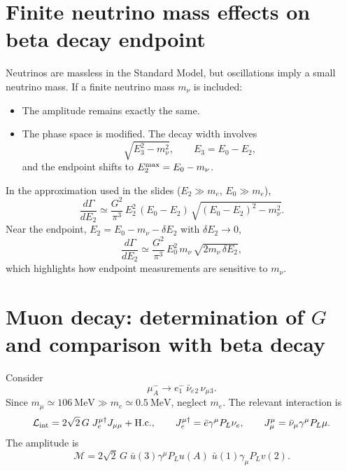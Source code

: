 \section{Finite neutrino mass effects on beta decay endpoint}
Neutrinos are massless in the Standard Model, but oscillations imply a small neutrino mass.
If a finite neutrino mass $m_\nu$ is included:
\begin{itemize}
  \item The amplitude remains exactly the same.
  \item The phase space is modified. The decay width involves
        \begin{equation}
        \sqrt{E_3^2-m_\nu^2},
        \qquad E_3=E_0-E_2,
        \end{equation}
        and the endpoint shifts to $E_2^{\rm max}=E_0-m_\nu$.
\end{itemize}
In the approximation used in the slides ($E_2\gg m_e$, $E_0\gg m_e$),
\begin{equation}
\boxed{
\frac{d\Gamma}{dE_2}
\simeq
\frac{G^2}{\pi^3}\,E_2^2\,(E_0-E_2)\,\sqrt{(E_0-E_2)^2-m_\nu^2}.
}
\end{equation}
Near the endpoint, $E_2=E_0-m_\nu-\delta E_2$ with $\delta E_2\to 0$,
\begin{equation}
\frac{d\Gamma}{dE_2}
\simeq
\frac{G^2}{\pi^3}\,E_0^2\,m_\nu\,\sqrt{2m_\nu\,\delta E_2},
\end{equation}
which highlights how endpoint measurements are sensitive to $m_\nu$.

\section{Muon decay: determination of $G$ and comparison with beta decay}
Consider
\begin{equation}
\mu^-_A \to e^-_1\,\bar\nu_e{}_2\,\nu_\mu{}_3.
\end{equation}
Since $m_\mu\simeq 106~\text{MeV}\gg m_e\simeq 0.5~\text{MeV}$, neglect $m_e$.
The relevant interaction is
\begin{equation}
\mathcal{L}_{\rm int}
=
2\sqrt{2}\,G\;J_e^{\mu\dagger}J_{\mu\mu}+\text{H.c.},
\qquad
J_e^{\mu\dagger}=\bar e\gamma^\mu P_L \nu_e,
\qquad
J_{\mu}^\mu=\bar\nu_\mu\gamma^\mu P_L \mu.
\end{equation}
The amplitude is
\begin{equation}
\mathcal{M}
=
2\sqrt{2}\,G\;\bar u(3)\gamma^\mu P_L u(A)\;\bar u(1)\gamma_\mu P_L v(2).
\end{equation}

